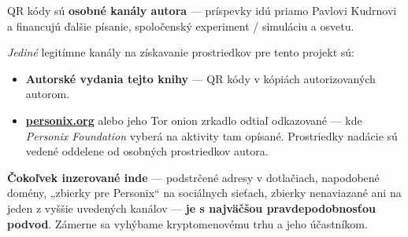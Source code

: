 \begin{minipage}[t]{0.60\textwidth}
\vspace{0pt}
\begin{mdframed}[
  linewidth=0.7pt,roundcorner=5pt,
  innerleftmargin=10pt,innerrightmargin=10pt,
  innertopmargin=8pt,innerbottommargin=8pt,
  skipabove=0pt,skipbelow=0pt,
  linecolor=cbwarning!50,backgroundcolor=cbwarning!5,
  nobreak=true,
  needspace=4\baselineskip,
]
\footnotesize
QR kódy sú \textbf{osobné kanály autora} --- príspevky idú priamo Pavlovi Kudrnovi a financujú ďalšie písanie, spoločenský experiment / simuláciu a osvetu.

\smallskip
\emph{Jediné} legitímne kanály na získavanie prostriedkov pre tento projekt sú:

\smallskip
\begin{itemize}
\setlength{\itemsep}{0pt}
\setlength{\topsep}{0pt}
\item \textbf{Autorské vydania tejto knihy} --- QR kódy v kópiách autorizovaných autorom.
\item \href{https://personix.org}{\textbf{personix.org}} alebo jeho Tor onion zrkadlo odtiaľ odkazované --- kde \emph{Personix Foundation} vyberá na aktivity tam opísané. Prostriedky nadácie sú vedené oddelene od osobných prostriedkov autora.
\end{itemize}

\smallskip
\textbf{Čokoľvek inzerované inde} --- podstrčené adresy v dotlačiach, napodobené domény, „zbierky pre Personix“ na sociálnych sieťach, zbierky nenaviazané ani na jeden z vyššie uvedených kanálov --- \textbf{je s najväčšou pravdepodobnosťou podvod}. Zámerne sa vyhýbame kryptomenovému trhu a jeho účastníkom.
\end{mdframed}
\end{minipage}

\clearpage
